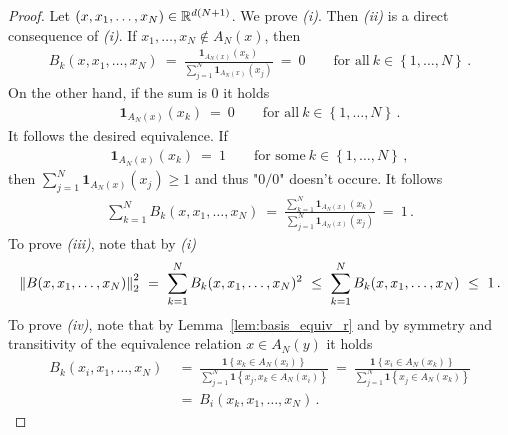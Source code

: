 \begin{proof}
  Let $(x,x_1,\ldots,x_N)\in\mathbb{R}^{d(N+1)}$.
  We prove \textit{(i)}.
  Then \textit{(ii)} is a direct consequence of \textit{(i)}.
  If 
      $
        x_1,\ldots,x_N\notin A_N(x)
      $,
  then
  \begin{align*}
    B_k(
        x,x_1,\ldots,x_N
    )
    \ 
    =
    \ 
\frac
  {
    \mathbf{1}
    _{
      A_N(x)
    }
    (x_k)
  }
  {
    \sum_{j=1}^N
    \mathbf{1}
    _{
      A_N(x)
    }
    (x_j)
    }
    \ 
    =
    \ 
    0
    \qquad
    \text{for all}\ 
    k\in \left\{ 1,\ldots,N \right\}
    \,.
  \end{align*}
  On the other hand, if the sum is 0 it holds
  \begin{align*}
    \mathbf{1}
    _{
      A_N(x)
    }
    (x_k)
    \ 
  =
  \ 
  0
    \qquad
    \text{for all}\ 
    k\in \left\{ 1,\ldots,N \right\}
    \,.
  \end{align*}
  It follows the desired equivalence.
  If 
  \begin{align*}
    \mathbf{1}
    _{
      A_N(x)
    }
    (x_k)
    \ 
  =
  \ 
  1
    \qquad
    \text{for some}\ 
    k\in \left\{ 1,\ldots,N \right\}
    \,,
  \end{align*}
  then
  $
    \sum_{j=1}^N
    \mathbf{1}
    _{
      A_N(x)
    }
    (x_j)
    \ge 1
  $
  and thus "$0/0$" doesn't occure. 
  It follows
  \begin{align*}
      \sum_{k=1}^{N} 
      B_k(x,x_1,\ldots,x_N)
      \ 
      =
      \ 
\frac
  {
      \sum_{k=1}^{N} 
    \mathbf{1}
    _{
      A_N(x)
    }
    (x_k)
  }
  {
    \sum_{j=1}^N
    \mathbf{1}
    _{
      A_N(x)
    }
    (x_j)
    }
    \ 
    =
    \ 
    1
    \,.
  \end{align*}
  To prove \textit{(iii)}, note that by \textit{(i)}
  \begin{align*}
        \norm
        {
      B(x,x_1,\ldots,x_N)
        }_2^2
        \ 
        =
        \ 
      \sum_{k=1}^{N} 
      B_k(x,x_1,\ldots,x_N)^2
        \ 
      \le
        \ 
      \sum_{k=1}^{N} 
      B_k(x,x_1,\ldots,x_N)
        \ 
      \le
        \ 
      1
      \,.
  \end{align*}
  To prove \textit{(iv)}, note that by Lemma~\ref{lem:basis_equiv_r}
  and by symmetry and transitivity of the equivalence relation
  $x\in A_N(y)$
  it holds
  \begin{align*}
      B_k(x_i,x_1,\ldots,x_N)
      &
    \ 
      =
    \ 
 \frac
  {
    \mathbf{1}
    \left\{ 
      x_k
      \in
      A_N(x_i)
    \right\}
  }
  {
    \sum_{j=1}^N
    \mathbf{1}
    \left\{ 
      x_j
      ,
      x_k
      \in
      A_N(x_i)
    \right\}
    }
    \ 
    =
    \ 
 \frac
  {
    \mathbf{1}
    \left\{ 
      x_i
      \in
      A_N(x_k)
    \right\}
  }
  {
    \sum_{j=1}^N
    \mathbf{1}
    \left\{ 
      x_j
      \in
      A_N(x_k)
    \right\}
    }
    \\
    &
    \ 
    =
    \ 
      B_i(x_k,x_1,\ldots,x_N)
      \,.
  \end{align*}
\end{proof}
